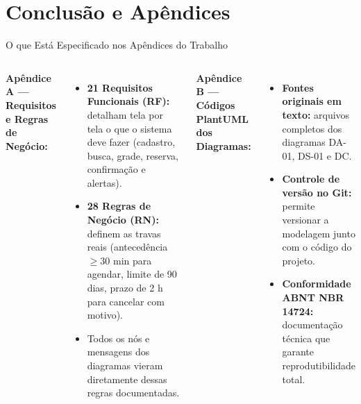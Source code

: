 \documentclass[aspectratio=169,t,xcolor=table]{beamer}
\newcommand{\setLayoutClean}{%
    \usebackgroundtemplate{}%
    \setDefaultConfig%
}
\begin{document}
\section{Conclusão e Apêndices}

\setLayoutClean
\begin{frame}{O que Está Especificado nos Apêndices do Trabalho}
    \begin{columns}[T]
        \textbf{Apêndice A --- Requisitos e Regras de Negócio:}
        {\footnotesize
        \begin{itemize}\setlength{\itemsep}{2pt}
            \item \textbf{21 Requisitos Funcionais (RF):} detalham tela por tela o que o sistema deve fazer (cadastro, busca, grade, reserva, confirmação e alertas).
            \item \textbf{28 Regras de Negócio (RN):} definem as travas reais (antecedência $\ge 30\text{ min}$ para agendar, limite de 90 dias, prazo de 2 h para cancelar com motivo).
            \item Todos os nós e mensagens dos diagramas vieram diretamente dessas regras documentadas.
        \end{itemize}
        }

        \textbf{Apêndice B --- Códigos PlantUML dos Diagramas:}
        {\footnotesize
        \begin{itemize}\setlength{\itemsep}{2pt}
            \item \textbf{Fontes originais em texto:} arquivos completos dos diagramas DA-01, DS-01 e DC.
            \item \textbf{Controle de versão no Git:} permite versionar a modelagem junto com o código do projeto.
            \item \textbf{Conformidade ABNT NBR 14724:} documentação técnica que garante reprodutibilidade total.
        \end{itemize}
        }
    \end{columns}
\end{frame}
\end{document}
